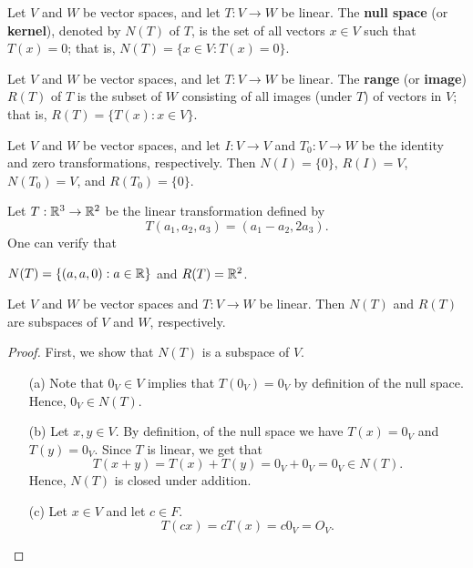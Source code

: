 \begin{definition}\label{Null Spaces}
    Let \( V  \) and \( W  \) be vector spaces, and let \( T: V \to W  \) be linear. 
   The \textbf{null space} (or \textbf{kernel}), denoted by \( N(T) \) of \( T  \), is the set of all vectors \( x \in V  \) such that \( T(x) = 0  \); that is, \( N(T) = \{ x \in V : T(x) = 0  \}  \). 
\end{definition}

\begin{definition}[Range]\label{Range}
    Let \( V  \) and \( W  \) be vector spaces, and let \( T: V \to W  \) be linear. 
   The \textbf{range} (or \textbf{image}) \( R(T)  \) of \( T  \) is the subset of \( W  \) consisting of all images (under \( T \)) of vectors in \( V  \); that is, \( R(T) = \{ T(x) : x \in V  \}  \).
\end{definition}

\begin{eg}
    Let \( V  \) and \( W  \) be vector spaces, and let \( I: V \to V  \) and \( T_{0}: V \to W  \) be the identity and zero transformations, respectively. Then \( N(I) = \{ 0  \}  \), \( R(I) = V  \), \( N(T_{0}) = V  \), and \( R(T_{0}) = \{ 0 \}  \).
\end{eg}


\begin{eg}
    Let \( T: \mathbb{R}^{3} \to \mathbb{R}^{2}  \) be the linear transformation defined by  
    \[  T(a_{1}, a_{2}, a_{3}) = (a_{1} - a_{2}, 2a_{3} ). \]
    One can verify that 
    \begin{center}
        \( N(T) = \{ (a,a,0) : a \in \mathbb{R}  \}  \) and \( R(T) = \mathbb{R}^{2} \).
    \end{center}
\end{eg}


\begin{theorem}[ ]
    Let \( V  \) and \( W  \) be vector spaces and \( T: V \to W  \) be linear. Then \( N(T) \) and \( R(T) \) are subspaces of \( V  \) and \( W  \), respectively.
\end{theorem}
\begin{proof}
    First, we show that \( N(T) \) is a subspace of \( V  \). 
    \begin{enumerate}
        \item[(a)] Note that \( 0_{V} \in V  \) implies that \( T(0_{V}) = 0_{V} \) by definition of the null space. Hence, \( 0_{V} \in N(T)  \).
        \item[(b)] Let \( x, y \in V \). By definition, of the null space we have \( T(x) = 0_{V}  \) and \( T(y) = 0_{V} \). Since \( T  \) is linear, we get that
            \[  T(x+y) = T(x) + T(y) = 0_{V} + 0_{V} = 0_{V} \in N(T). \]
        Hence, \( N(T) \) is closed under addition.
        \item[(c)] Let \( x \in V  \) and let \( c \in F  \). 
            \[ T(cx) = cT(x) = c 0_{V} = O_{V}.  \]
    \end{enumerate}
\end{proof}
